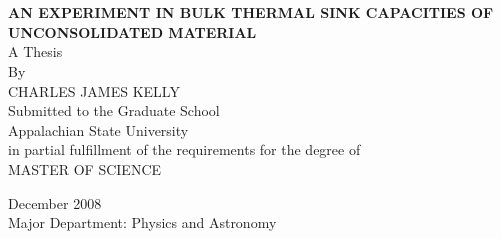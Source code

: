 
\doublespacing
\thispagestyle{empty}
\section*{}
\begin{center}
\textbf{AN EXPERIMENT IN BULK THERMAL SINK CAPACITIES OF UNCONSOLIDATED MATERIAL\\}
\vspace{20mm}
A Thesis\\By\\CHARLES JAMES KELLY\\
\vspace{20mm}
Submitted to the Graduate School\\Appalachian State University\\
in partial fulfillment of the requirements for the degree of\\
MASTER OF SCIENCE\\
\vspace{20mm}
\date\\
December 2008\\
Major Department: Physics and Astronomy

\end{center}
%